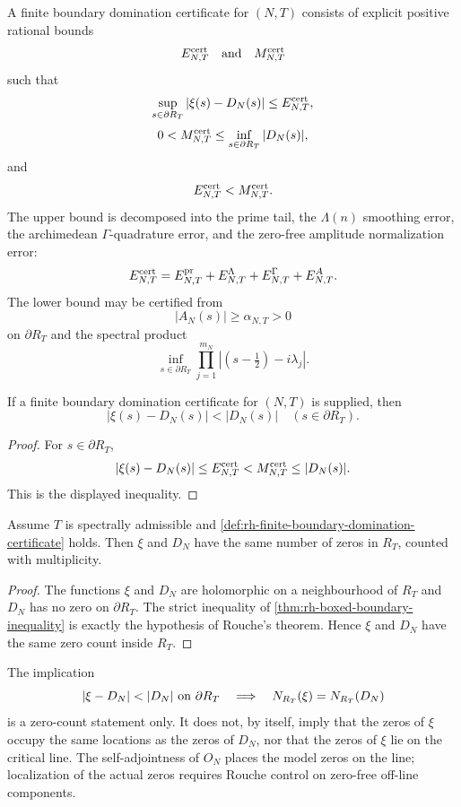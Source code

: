 \begin{definition}
\label{def:rh-finite-boundary-domination-certificate}
A finite boundary domination certificate for $(N,T)$ consists of explicit
positive rational bounds
$$
E_{N,T}^{\rm cert}
\quad\hbox{and}\quad
M_{N,T}^{\rm cert}
$$
such that
$$
\sup_{s\in\partial R_T}|\xi(s)-D_N(s)|\le E_{N,T}^{\rm cert},
$$
$$
0<M_{N,T}^{\rm cert}\le \inf_{s\in\partial R_T}|D_N(s)|,
$$
and
$$
E_{N,T}^{\rm cert}<M_{N,T}^{\rm cert}.
$$
The upper bound is decomposed into the prime tail, the $\Lambda(n)$ smoothing
error, the archimedean $\Gamma$-quadrature error, and the zero-free amplitude
normalization error:
$$
E_{N,T}^{\rm cert}
=
E^{\rm pr}_{N,T}+E^{\Lambda}_{N,T}+E^{\Gamma}_{N,T}+E^{A}_{N,T}.
$$
The lower bound may be certified from
$$
|A_N(s)|\ge \alpha_{N,T}>0
$$
on $\partial R_T$ and the spectral product
$$
\inf_{s\in\partial R_T}
\prod_{j=1}^{m_N}|(s-\tfrac12)-i\lambda_j|.
$$
\end{definition}

\begin{theorem}
\label{thm:rh-boxed-boundary-inequality}
If a finite boundary domination certificate for $(N,T)$ is supplied, then
$$
\boxed{
\ |\xi(s)-D_N(s)|<|D_N(s)|\quad(s\in\partial R_T).
\ }
$$
\end{theorem}

\begin{proof}
For $s\in\partial R_T$,
$$
|\xi(s)-D_N(s)|
\le E_{N,T}^{\rm cert}
<M_{N,T}^{\rm cert}
\le |D_N(s)|.
$$
This is the displayed inequality.
\end{proof}

\begin{theorem}
\label{thm:rh-outer-rectangle-rouche-count}
Assume $T$ is spectrally admissible and
\autoref{def:rh-finite-boundary-domination-certificate} holds.  Then $\xi$ and
$D_N$ have the same number of zeros in $R_T$, counted with multiplicity.
\end{theorem}

\begin{proof}
The functions $\xi$ and $D_N$ are holomorphic on a neighbourhood of $R_T$ and
$D_N$ has no zero on $\partial R_T$.  The strict inequality of
\autoref{thm:rh-boxed-boundary-inequality} is exactly the hypothesis of
Rouche's theorem.  Hence $\xi$ and $D_N$ have the same zero count inside
$R_T$.
\end{proof}

\begin{principle}
\label{prin:rh-full-rectangle-rouche-count-only}
The implication
$$
|\xi-D_N|<|D_N|\hbox{ on }\partial R_T
\quad\Longrightarrow\quad
N_{R_T}(\xi)=N_{R_T}(D_N)
$$
is a zero-count statement only.  It does not, by itself, imply that the zeros
of $\xi$ occupy the same locations as the zeros of $D_N$, nor that the zeros
of $\xi$ lie on the critical line.  The self-adjointness of $O_N$ places the
model zeros on the line; localization of the actual zeros requires Rouche
control on zero-free off-line components.
\end{principle}

